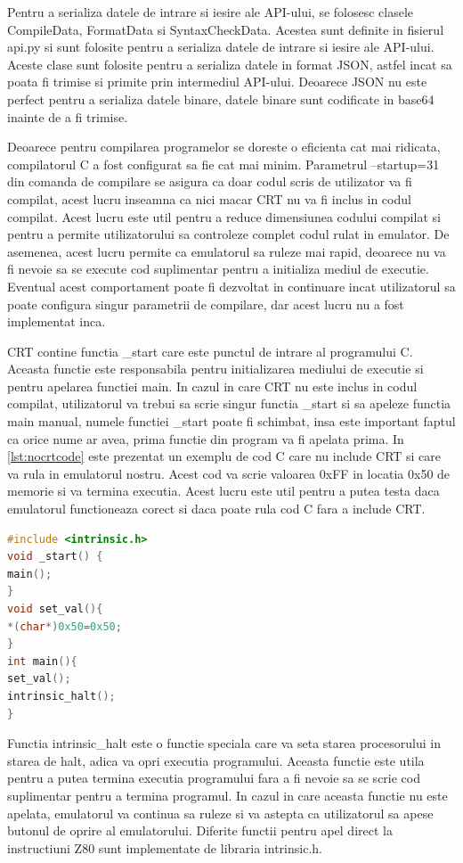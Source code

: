 \documentclass[titlepage,12pt]{article}
\DeclareRobustCommand{\code}[1]{{\ttfamily\small #1}}
\begin{document}
Pentru a serializa datele de intrare si iesire ale API-ului, se folosesc clasele \code{CompileData}, \code{FormatData} si \code{SyntaxCheckData}. Acestea sunt definite in fisierul \code{api.py} si sunt folosite pentru a serializa datele de intrare si iesire ale API-ului. Aceste clase sunt folosite pentru a serializa datele in format JSON, astfel incat sa poata fi trimise si primite prin intermediul API-ului.
Deoarece JSON nu este perfect pentru a serializa datele binare, datele binare sunt codificate in \code{base64} inainte de a fi trimise.

Deoarece pentru compilarea programelor se doreste o eficienta cat mai ridicata, compilatorul C a fost configurat sa fie cat mai minim. Parametrul \code{--startup=31} din comanda de compilare se asigura ca doar codul scris de utilizator va fi compilat, acest lucru inseamna ca nici macar \ac{CRT} nu va fi inclus in codul compilat. Acest lucru este util pentru a reduce dimensiunea codului compilat si pentru a permite utilizatorului sa controleze complet codul rulat in emulator. De asemenea, acest lucru permite ca emulatorul sa ruleze mai rapid, deoarece nu va fi nevoie sa se execute cod suplimentar pentru a initializa mediul de executie. Eventual acest comportament poate fi dezvoltat in continuare incat utilizatorul sa poate configura singur parametrii de compilare, dar acest lucru nu a fost implementat inca.

\ac {CRT} contine functia \code{\_start} care este punctul de intrare al programului C. Aceasta functie este responsabila pentru initializarea mediului de executie si pentru apelarea functiei \code{main}. In cazul in care \ac {CRT} nu este inclus in codul compilat, utilizatorul va trebui sa scrie singur functia \code{\_start} si sa apeleze functia \code{main} manual, numele functiei \code{\_start} poate fi schimbat, insa este important faptul ca orice nume ar avea, prima functie din program va fi apelata prima. In \cref{lst:nocrtcode} este prezentat un exemplu de cod C care nu include \ac {CRT} si care va rula in emulatorul nostru. Acest cod va scrie valoarea \code{0xFF} in locatia \code{0x50} de memorie si va termina executia. Acest lucru este util pentru a putea testa daca emulatorul functioneaza corect si daca poate rula cod C fara a include \ac{CRT}.
\begin{lstlisting}[language=C,caption={Cod C fara CRT},label={lst:nocrtcode}]
#include <intrinsic.h>
void _start() {
main();
}
void set_val(){
*(char*)0x50=0x50;
}
int main(){
set_val();
intrinsic_halt();
}
\end{lstlisting}
Functia \code{intrinsic\_halt} este o functie speciala care va seta starea procesorului in starea de \code{halt}, adica va opri executia programului. Aceasta functie este utila pentru a putea termina executia programului fara a fi nevoie sa se scrie cod suplimentar pentru a termina programul. In cazul in care aceasta functie nu este apelata, emulatorul va continua sa ruleze si va astepta ca utilizatorul sa apese butonul de oprire al emulatorului. Diferite functii pentru apel direct la instructiuni Z80 sunt implementate de libraria \code{intrinsic.h}.
\end{document}
